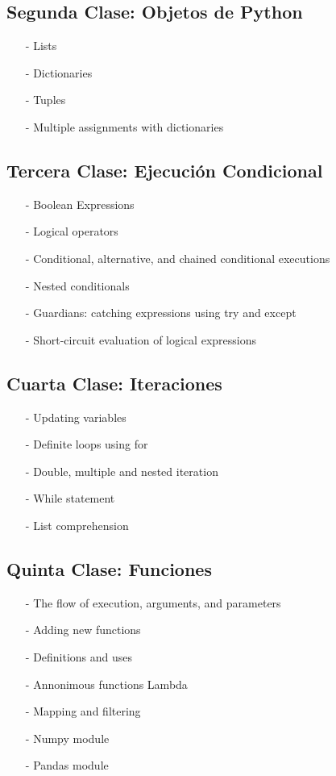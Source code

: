 \documentclass[12pt]{article}
\begin{document}
\subsection*{Segunda Clase: Objetos de Python}
\begin{itemize}
\item[-]	Lists
\item[-]	Dictionaries
\item[-]	Tuples
\item[-]	Multiple assignments with dictionaries
\end{itemize}

\subsection*{Tercera Clase: Ejecución Condicional}
\begin{itemize}
\item[-]	Boolean Expressions
\item[-]	Logical operators
\item[-]	Conditional, alternative, and chained conditional executions
\item[-]	Nested conditionals
\item[-]	Guardians: catching expressions using try and except
\item[-]	Short-circuit evaluation of logical expressions
\end{itemize}

\subsection*{Cuarta Clase: Iteraciones}
\begin{itemize}
\item[-]	Updating variables
\item[-]	Definite loops using for
\item[-]	Double, multiple and nested iteration
\item[-]	While statement
\item[-]	List comprehension
\end{itemize}

\subsection*{Quinta Clase: Funciones}
\begin{itemize}
\item[-]	The flow of execution, arguments, and parameters
\item[-]    Adding new functions
\item[-]	Definitions and uses
\item[-]	Annonimous functions Lambda
\item[-]	Mapping and filtering
\item[-]	Numpy module
\item[-]	Pandas module
\end{itemize}
\end{document}
